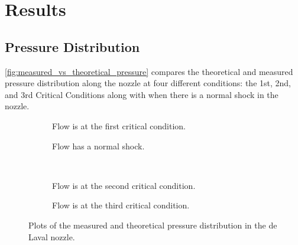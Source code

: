 \chapter{Results} \label{cp:results}

\section{Pressure Distribution}
\autoref{fig:measured_vs_theoretical_pressure} compares the theoretical and measured pressure distribution along the nozzle at four different conditions: the 1st, 2nd, and 3rd Critical Conditions along with when there is a normal shock in the nozzle. 

\begin{figure}
    \centering
    \begin{subfigure}{0.49\textwidth}
        \centering
        
        \caption{Flow is at the first critical condition.}
        \label{fig:measured_vs_theoretical_pressure_1st_critical}
    \end{subfigure}
    \begin{subfigure}{0.49\textwidth}
        \centering
        
        \caption{Flow has a normal shock.}
        \label{fig:measured_vs_theoretical_pressure_normal_shock}
    \end{subfigure} \\
    \begin{subfigure}{0.49\textwidth}
        \centering
        
        \caption{Flow is at the second critical condition.}
        \label{fig:measured_vs_theoretical_pressure_2nd_critical}
    \end{subfigure}
    \begin{subfigure}{0.49\textwidth}
        \centering
        
        \caption{Flow is at the third critical condition.}
        \label{fig:measured_vs_theoretical_pressure_3rd_critical}
    \end{subfigure}
    \caption{Plots of the measured and theoretical pressure distribution in the de Laval nozzle.}
    \label{fig:measured_vs_theoretical_pressure}
\end{figure}

